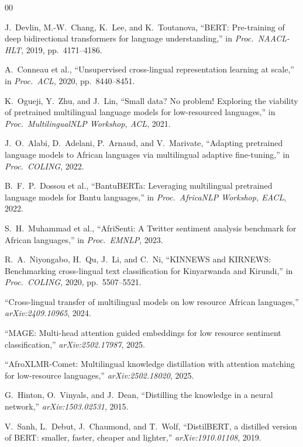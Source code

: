 \documentclass[conference]{IEEEtran}
\begin{document}
\begin{thebibliography}{00}

J.\ Devlin, M.-W.\ Chang, K.\ Lee, and K.\ Toutanova,
``BERT: Pre-training of deep bidirectional transformers for language understanding,''
in \emph{Proc.\ NAACL-HLT}, 2019, pp.\ 4171--4186.

A.\ Conneau et al.,
``Unsupervised cross-lingual representation learning at scale,''
in \emph{Proc.\ ACL}, 2020, pp.\ 8440--8451.

K.\ Ogueji, Y.\ Zhu, and J.\ Lin,
``Small data? No problem! Exploring the viability of pretrained
multilingual language models for low-resourced languages,''
in \emph{Proc.\ MultilingualNLP Workshop, ACL}, 2021.

J.\ O.\ Alabi, D.\ Adelani, P.\ Arnaud, and V.\ Marivate,
``Adapting pretrained language models to African languages via
multilingual adaptive fine-tuning,''
in \emph{Proc.\ COLING}, 2022.

B.\ F.\ P.\ Dossou et al.,
``BantuBERTa: Leveraging multilingual pretrained language models for
Bantu languages,''
in \emph{Proc.\ AfricaNLP Workshop, EACL}, 2022.

S.\ H.\ Muhammad et al.,
``AfriSenti: A Twitter sentiment analysis benchmark for African languages,''
in \emph{Proc.\ EMNLP}, 2023.

R.\ A.\ Niyongabo, H.\ Qu, J.\ Li, and C.\ Ni,
``KINNEWS and KIRNEWS: Benchmarking cross-lingual text classification
for Kinyarwanda and Kirundi,''
in \emph{Proc.\ COLING}, 2020, pp.\ 5507--5521.

``Cross-lingual transfer of multilingual models on low resource African
languages,''
\emph{arXiv:2409.10965}, 2024.

``MAGE: Multi-head attention guided embeddings for low resource sentiment
classification,''
\emph{arXiv:2502.17987}, 2025.

``AfroXLMR-Comet: Multilingual knowledge distillation with attention
matching for low-resource languages,''
\emph{arXiv:2502.18020}, 2025.

G.\ Hinton, O.\ Vinyals, and J.\ Dean,
``Distilling the knowledge in a neural network,''
\emph{arXiv:1503.02531}, 2015.

V.\ Sanh, L.\ Debut, J.\ Chaumond, and T.\ Wolf,
``DistilBERT, a distilled version of BERT: smaller, faster, cheaper
and lighter,''
\emph{arXiv:1910.01108}, 2019.


\end{thebibliography}
\end{document}
